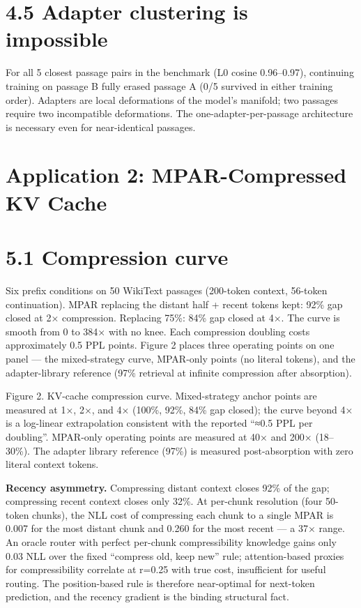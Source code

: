 \section{4.5 Adapter clustering is impossible}\label{adapter-clustering-is-impossible}

For all 5 closest passage pairs in the benchmark (L0 cosine 0.96--0.97), continuing training on passage B fully erased passage A (0/5 survived in either training order). Adapters are local deformations of the model's manifold; two passages require two incompatible deformations. The one-adapter-per-passage architecture is necessary even for near-identical passages.

\section{Application 2: MPAR-Compressed KV Cache}\label{application-2-mpar-compressed-kv-cache}

\section{5.1 Compression curve}\label{compression-curve}

Six prefix conditions on 50 WikiText passages (200-token context, 56-token continuation). MPAR replacing the distant half + recent tokens kept: 92\% gap closed at 2× compression. Replacing 75\%: 84\% gap closed at 4×. The curve is smooth from 0 to 384× with no knee. Each compression doubling costs approximately 0.5 PPL points. Figure 2 places three operating points on one panel --- the mixed-strategy curve, MPAR-only points (no literal tokens), and the adapter-library reference (97\% retrieval at infinite compression after absorption).

Figure 2. KV-cache compression curve. Mixed-strategy anchor points are measured at 1×, 2×, and 4× (100\%, 92\%, 84\% gap closed); the curve beyond 4× is a log-linear extrapolation consistent with the reported ``≈0.5 PPL per doubling''. MPAR-only operating points are measured at 40× and 200× (18--30\%). The adapter library reference (97\%) is measured post-absorption with zero literal context tokens.

\textbf{Recency asymmetry.} Compressing distant context closes 92\% of the gap; compressing recent context closes only 32\%. At per-chunk resolution (four 50-token chunks), the NLL cost of compressing each chunk to a single MPAR is 0.007 for the most distant chunk and 0.260 for the most recent --- a 37× range. An oracle router with perfect per-chunk compressibility knowledge gains only 0.03 NLL over the fixed ``compress old, keep new'' rule; attention-based proxies for compressibility correlate at r=0.25 with true cost, insufficient for useful routing. The position-based rule is therefore near-optimal for next-token prediction, and the recency gradient is the binding structural fact.

